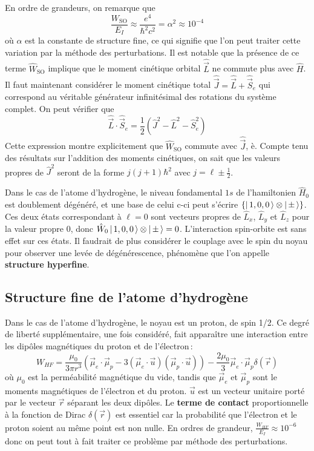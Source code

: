         En ordre de grandeurs, on remarque que 
        \[ \frac{W_{\text{SO}}}{E_I} \approx \frac{e^4}{\hbar^2 c^2} = \alpha^2 \approx 10^{-4} \]
        où $\alpha$ est la constante de structure fine, ce qui signifie que l’on peut traiter cette variation par la méthode des perturbations. Il est notable que la présence de ce terme $\hat{W}_{\text{SO}}$ implique que le moment cinétique orbital $\hat{\vec{L}}$ ne commute plus avec $\hat{H}$. Il faut maintenant considérer le moment cinétique total $\hat{\vec{J}} = \hat{\vec{L}} + \hat{\vec{S}}_e$ qui correspond au véritable générateur infinitésimal des rotations du système complet. On peut vérifier que 
        \[ \hat{\vec{L}} \cdot \hat{\vec{S}}_e = \frac{1}{2} \left(\hat{J}^2 - \hat{L}^2 - \hat{S}^2_e\right) \]   
        Cette expression montre explicitement que $\hat{W}_{\text{SO}}$ commute avec $\hat{\vec{J}}$, è. Compte tenu des résultats sur l’addition des moments cinétiques, on sait que les valeurs propres de $\hat{J}^2$ seront de la forme $j(j+1)\hbar^2$ avec $j = \ell \pm \frac{1}{2}$.

        Dans le cas de l’atome d’hydrogène, le niveau fondamental $1s$ de l’hamiltonien $\hat{H}_0$ est doublement dégénéré, et une base de celui c-ci peut s’écrire $\left\{\left| \, 1,0,0 \, \right> \otimes \left| \, \pm \, \right>\right\}$. Ces deux états correspondant à $\ell = 0$ sont vecteurs propres de $\hat{L}_x$, $\hat{L}_y$ et $\hat{L}_z$ pour la valeur propre $0$, donc $\hat{W}_0 \left| \, 1,0,0 \, \right> \otimes \left| \, \pm \, \right> = 0$. L’interaction spin-orbite est sans effet sur ces états. Il faudrait de plus considérer le couplage avec le spin du noyau pour observer une levée de dégénérescence, phénomène que l’on appelle \textbf{structure hyperfine}.

    \subsection{Structure fine de l’atome d’hydrogène}

        Dans le cas de l’atome d’hydrogène, le noyau est un proton, de spin 1/2. Ce degré de liberté supplémentaire, une fois considéré, fait apparaître une interaction entre les dipôles magnétiques du proton et de l’électron :
        \[ W_{HF} = \frac{\mu_0}{3\pi r^3} \left(\vec{\mu}_e \cdot \vec{\mu}_p - 3 (\vec{\mu}_e \cdot \vec{u})(\vec{\mu}_p \cdot \vec{u})\right) - \frac{2\mu_0}{3} \vec{\mu}_e \cdot \vec{\mu}_p \delta(\vec{r}) \]
        où $\mu_0$ est la perméabilité magnétique du vide, tandis que $\vec{\mu}_e$ et $\vec{\mu}_p$ sont le moments magnétiques de l’électron et du proton. $\vec{u}$ est un vecteur unitaire porté par le vecteur $\vec{r}$ séparant les deux dipôles. Le \textbf{terme de contact} proportionnelle à la fonction de Dirac $\delta(\vec{r})$ est essentiel car la probabilité que l’électron et le proton soient au même point est non nulle. En ordres de grandeur, $\frac{W_{HF}}{E_I} \approx 10^{-6}$ donc on peut tout à fait traiter ce problème par méthode des perturbations.


